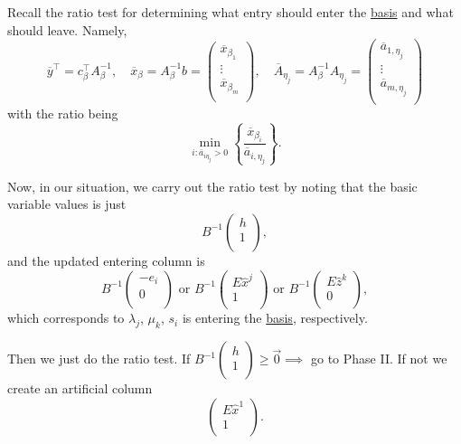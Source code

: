 Recall the ratio test for determining what entry should enter the \hyperref[def:basis]{basis} and what should leave. Namely,
\[
	\overline{y}^{\top} = c_{\beta}^{\top} A_{\beta}^{-1},\quad \overline{x}_{\beta} = A_{\beta}^{-1} b = \begin{pmatrix}
		\overline{x}_{\beta_1} \\
		\vdots                 \\
		\overline{x}_{\beta_m} \\
	\end{pmatrix}, \quad \overline{A}_{\eta_{j}} = A_{\beta}^{-1} A_{\eta_{j}} = \begin{pmatrix}
		\overline{a}_{1, \eta_{j}} \\
		\vdots                     \\
		\overline{a}_{m, \eta_{j}} \\
	\end{pmatrix}
\]
with the ratio being
\[
	\min_{i\colon \overline{a}_{i\eta_{j}}>0}\left\{\frac{\overline{x}_{\beta_{i}}}{\overline{a}_{i, \eta_{j}}}\right\}.
\]

Now, in our situation, we carry out the ratio test by noting that the basic variable values is just
\[
	B^{-1}\begin{pmatrix}
		h \\
		1 \\
	\end{pmatrix},
\]
and the updated entering column is
\[
	B^{-1} 	\begin{pmatrix}
		-e_{i} \\
		0      \\
	\end{pmatrix} \text{ or } B^{-1}\begin{pmatrix}
		E \hat{x}^j \\
		1           \\
	\end{pmatrix} \text{ or } B^{-1}\begin{pmatrix}
		E \hat{z}^k \\
		0           \\
	\end{pmatrix},
\]
which corresponds to \(\lambda_{j}\), \(\mu_k\), \(s_{i}\) is entering the \hyperref[def:basis]{basis}, respectively.

Then we just do the ratio test. If \(B^{-1}\begin{pmatrix}
	h \\
	1 \\
\end{pmatrix}\geq \vec{0}\implies\) go to Phase II. If not we create an artificial column
\[
	\begin{pmatrix}
		E\hat{x}^1 \\
		1          \\
	\end{pmatrix}.
\]